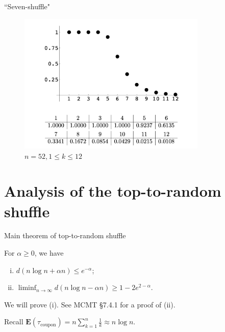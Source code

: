 \documentclass[10pt]{beamer}
\newcommand{\E}{\mathbf{E}}
\begin{document}
\begin{frame}[label=BD1992fig]{``Seven-shuffle"}
    \begin{figure}
        \includegraphics[width = 0.8\textwidth]{convfig.png}
        \caption{$n = 52, 1\leq k \leq 12$}
    \end{figure}
\end{frame}

\section{Analysis of the top-to-random shuffle}

\begin{frame}{Main theorem of top-to-random shuffle}
    \begin{theorem}
    For $\alpha \geq 0$, we have 
        \begin{enumerate}[(i)]
            \item $d(n\log n+ \alpha n) \leq e^{-\alpha}$;
            \item %
            $\liminf_{n\to\infty} d(n\log n - \alpha n) \geq 1 - 2 e^{2-\alpha}$.
        \end{enumerate}
    \end{theorem}
    We will prove (i). See MCMT \S 7.4.1 for a proof of (ii).

    Recall $\E(\tau_\mathrm{coupon}) = n \sum_{k=1}^n\frac{1}{k} \approx n\log n$.
\end{frame}
\end{document}
